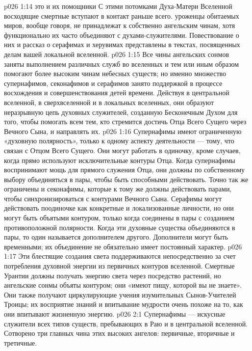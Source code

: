 \vs p026 1:14 \pc {}\bibnobreakspace {} это  и их помощники  С этими потомками Духа\hyp{}Матери Вселенной восходящие смертные вступают в контакт раньше всего.  уроженцы обитаемых миров, вообще говоря, не принадлежат к собственно ангельским чинам, хотя функционально их часто объединяют с духами\hyp{}служителями. Повествование о них и рассказ о серафимах и херувимах представлены в текстах, посвященных делам вашей локальной вселенной.
\vs p026 1:15 \pc Все чины ангельских сонмов заняты выполнением различных служб во вселенных и тем или иным образом помогают более высоким чинам небесных существ; но именно множество супернафимов, секонафимов и серафимов занято поддержкой в процессе восхождения и совершенствования детей времени. Действуя в центральной вселенной, в сверхвселенной и в локальных вселенных, они образуют неразрывную цепь духовных служителей, созданную Бесконечным Духом для того, чтобы помогать всем тем, кто стремится достичь Отца Всего Сущего через Вечного Сына, и направлять их.
\vs p026 1:16 Супернафимы имеют ограниченную «духовную полярность», только к одному аспекту деятельности --- тому, что связан с Отцом Всего Сущего. Они могут работать в одиночку, кроме случаев, когда прямо используют исключительные контуры Отца. Когда супернафимы воспринимают мощь для прямого служения Отца, они должны по собственному выбору объединяться в пары, чтобы быть способными действовать. Точно так же ограничены и секонафимы, которые к тому же должны действовать парами, чтобы синхронизироваться с контурами Вечного Сына. Серафимы могут действовать поодиночке как конкретные и локализованные личности, но они могут быть объятыми контуром, только когда соединены в пары с созданием противоположной полярности. Когда эти духовные существа объединяются в пары, то один называется дополнителем другого. Дополнители могут быть временными; их объединение не обязательно имеет постоянный характер.
\vs p026 1:17 Эти блестящие создания света поддерживаются непосредственно за счет потребления духовной энергии из первичных контуров вселенной. Смертные Урантии должны получать энергию света через посредство растений, но ангельские сонмы объяты контуром; они «имеют пищу, которой вы не знаете». Они также получают циркулирующие учения изумительных Сынов\hyp{}Учителей Троицы; их восприятие знаний и впитывание мудрости очень похоже на то, как они впитывают жизненную энергию.
\vs p026 2:1 Супернафимы --- искусные служители всех типов существ, пребывающих в Раю и в центральной вселенной. Сотворено три главных чина этих высоких ангелов: первичные, вторичные и третичные.
